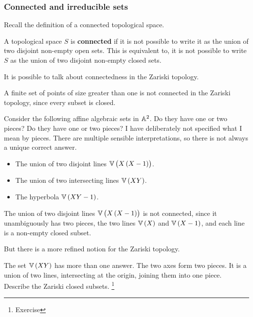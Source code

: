 \subsubsection{Connected and irreducible sets}

Recall the definition of a connected topological space.

\begin{definition*}
A topological space $ S $ is \textbf{connected} if it is not possible to write it as the union of two disjoint non-empty open sets. This is equivalent to, it is not possible to write $ S $ as the union of two disjoint non-empty closed sets.
\end{definition*}

It is possible to talk about connectedness in the Zariski topology.

\begin{example*}
A finite set of points of size greater than one is not connected in the Zariski topology, since every subset is closed.
\end{example*}

Consider the following affine algebraic sets in $ \AA^2 $. Do they have one or two pieces? Do they have one or two pieces? I have deliberately not specified what I mean by pieces. There are multiple sensible interpretations, so there is not always a unique correct answer.
\begin{itemize}
\item The union of two disjoint lines $ \VV\br{X\br{X - 1}} $.
\item The union of two intersecting lines $ \VV\br{XY} $.
\item The hyperbola $ \VV\br{XY - 1} $.
\end{itemize}

\begin{example*}
The union of two disjoint lines $ \VV\br{X\br{X - 1}} $ is not connected, since it unambiguously has two pieces, the two lines $ \VV\br{X} $ and $ \VV\br{X - 1} $, and each line is a non-empty closed subset.
\end{example*}

But there is a more refined notion for the Zariski topology.

\begin{example*}
The set $ \VV\br{XY} $ has more than one answer. The two axes form two pieces. It is a union of two lines, intersecting at the origin, joining them into one piece. Describe the Zariski closed subsets. \footnote{Exercise}
\end{example*}

